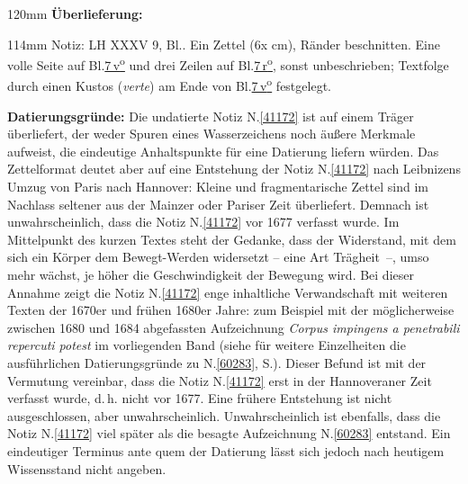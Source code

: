 %
\frenchspacing%
\begin{ledgroupsized}[r]{120mm}%
\footnotesize%
\pstart%
\noindent%
\textbf{Überlieferung:}%
\pend%
\end{ledgroupsized}%
\begin{ledgroupsized}[r]{114mm}%
\footnotesize%
\pstart%
\parindent -6mm%
%
Notiz:
LH XXXV 9, Bl..
Ein Zettel (6\;x cm),
Ränder beschnitten.
Eine volle Seite auf Bl.\;\href{\Scan{LH_35_09_16_007v}}{7\,v\textsuperscript{o}}
und drei Zeilen auf Bl.\;\href{\Scan{LH_35_09_16_007r}}{7\,r\textsuperscript{o}},
sonst unbeschrieben;
Textfolge durch einen Kustos (\textit{verte}) am Ende von Bl.\;\href{\Scan{LH_35_09_16_007v}}{7\,v\textsuperscript{o}} festgelegt.
\pend%
\end{ledgroupsized}%
\vspace{5mm}%
\begin{ledgroup}%
\footnotesize%
\pstart%
\noindent%
\textbf{Datierungsgründe:}
Die undatierte Notiz N.\;\ref{41172} ist auf einem Träger überliefert, der weder Spuren eines Wasserzeichens noch äußere Merkmale aufweist, die eindeutige Anhaltspunkte für eine Datierung liefern würden.
Das Zettelformat deutet aber auf eine Entstehung der Notiz N.\;\ref{41172} nach Leibnizens Umzug von Paris nach Hannover:
Kleine und fragmentarische Zettel sind im Nachlass seltener aus der Mainzer oder Pariser Zeit überliefert.
Demnach ist unwahrscheinlich, dass die Notiz N.\;\ref{41172} vor 1677 verfasst wurde.
\pend%
\pstart%
Im Mittelpunkt des kurzen Textes steht der Gedanke, dass der Widerstand, mit dem sich ein Körper dem Bewegt-Werden widersetzt -- eine Art Trägheit~--, umso mehr wächst, je höher die Geschwindigkeit der Bewegung wird.
Bei dieser Annahme zeigt die Notiz N.\;\ref{41172} enge inhaltliche Verwandschaft mit weiteren Texten der 1670er und frühen 1680er Jahre: zum Beispiel mit der möglicherweise zwischen 1680 und 1684 abgefassten Aufzeichnung \textit{Corpus impingens a penetrabili repercuti potest} im vorliegenden Band (siehe für weitere Einzelheiten die ausführlichen Datierungsgründe zu N.\;\ref{60283}, S.\;\pageref{60283_dat}).
Dieser Befund ist mit der Vermutung vereinbar, dass die Notiz N.\;\ref{41172} erst in der Hannoveraner Zeit verfasst wurde, d.\,h. nicht vor 1677.
Eine frühere Entstehung ist nicht ausgeschlossen, aber unwahrscheinlich.
Unwahrscheinlich ist ebenfalls, dass die Notiz N.\;\ref{41172} viel später als die besagte Aufzeichnung N.\;\ref{60283} entstand.
Ein eindeutiger Terminus ante quem der Datierung lässt sich jedoch nach heutigem Wissensstand nicht angeben.
\pend%
\end{ledgroup}%
